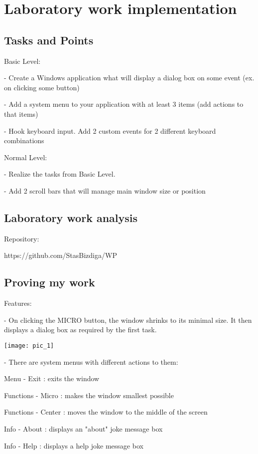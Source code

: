 \section{Laboratory work implementation}

\subsection{Tasks and Points}
Basic Level:

    - Create a Windows application what will display a dialog box on some event (ex. on clicking some button)
    
    - Add a system menu to your application with at least 3 items (add actions to that items)
   
    - Hook keyboard input. Add 2 custom events for 2 different keyboard combinations


Normal Level:

    - Realize the tasks from Basic Level.

    - Add 2 scroll bars that will manage main window size or position



\subsection{Laboratory work analysis}
Repository:

https://github.com/StasBizdiga/WP

\subsection{Proving my work}

Features:

- On clicking the MICRO button, the window shrinks to its minimal size. It then displays a dialog box as required by the first task.



\texttt{[image: pic\_1]}


- There are system menus with different actions to them:


Menu - Exit 	   : exits the window

Functions - Micro  : makes the window smallest possible

Functions - Center : moves the window to the middle of the screen

Info - About		: displays an "about" joke message box

Info - Help			: displays a help joke message box



